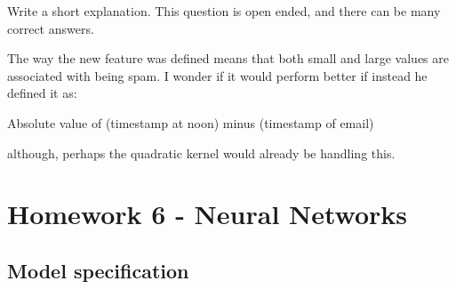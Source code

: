 Write a short explanation. This question is open ended, and there can be many correct answers.


\begin{mdframed}
  The way the new feature was defined means that both small and large values
  are associated with being spam. I wonder if it would perform better if
  instead he defined it as:
  \begin{center}
    Absolute value of (timestamp at noon) minus (timestamp of email)
  \end{center}
  although, perhaps the quadratic kernel would already be handling this.

\end{mdframed}

\section{Homework 6 - Neural Networks}
\subsection{Model specification}

